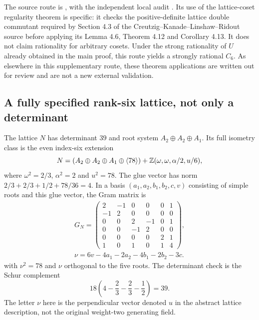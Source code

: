The source route is
, with the
independent local audit
.
Its use of the lattice-coset regularity theorem is specific: it
checks the positive-definite lattice double commutant required by
Section 4.3 of the Creutzig--Kanade--Linshaw--Ridout source before
applying its Lemma 4.6, Theorem 4.12 and Corollary 4.13.
It does not claim rationality for arbitrary cosets. Under the
strong rationality of $U$ already obtained in the main proof,
this route yields a strongly rational $C_6$. As elsewhere in
this supplementary route, these theorem applications are written
out for review and are not a new external validation.

\subsection{A fully specified rank-six lattice, not only a determinant}

The lattice $N$ has determinant $39$ and root system
$A_2\oplus A_2\oplus A_1$. Its full isometry class is the even
index-six extension
\[
 N=(A_2\oplus A_2\oplus A_1\oplus\langle78\rangle)
       +\mathbb Z(\omega,\omega,\alpha/2,u/6),
\]
where $\omega^2=2/3$, $\alpha^2=2$ and $u^2=78$. The glue
vector has norm $2/3+2/3+1/2+78/36=4$. In a basis
$(a_1,a_2,b_1,b_2,c,v)$ consisting of simple roots and this glue
vector, the Gram matrix is
\begin{equation}
\begin{gathered}
G_N=\begin{pmatrix}
2&-1&0&0&0&1\\
-1&2&0&0&0&0\\
0&0&2&-1&0&1\\
0&0&-1&2&0&0\\
0&0&0&0&2&1\\
1&0&1&0&1&4
\end{pmatrix},\\
\nu=6v-4a_1-2a_2-4b_1-2b_2-3c.
\end{gathered}
\label{expstructure:N-gram}
\end{equation}
with $\nu^2=78$ and $\nu$ orthogonal to the five roots.
The determinant check is the Schur complement
\[
 18\left(4-\frac23-\frac23-\frac12\right)=39.
\]
The letter $\nu$ here is the perpendicular vector denoted $u$
in the abstract lattice description, not the original weight-two
generating field.

